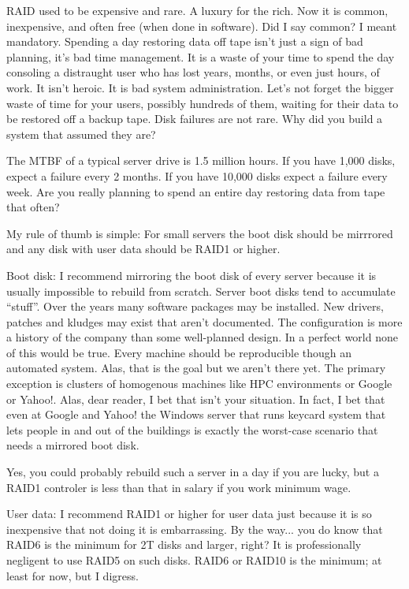 \documentclass{article}
\begin{document}
RAID used to be expensive and rare. A luxury for the rich. Now it is common, inexpensive, and often free (when done in software). Did I say common? I meant mandatory. Spending a day restoring data off tape isn't just a sign of bad planning, it's bad time management. It is a waste of your time to spend the day consoling a distraught user who has lost years, months, or even just hours, of work. It isn't heroic. It is bad system administration. Let's not forget the bigger waste of time for your users, possibly hundreds of them, waiting for their data to be restored off a backup tape. Disk failures are not rare. Why did you build a system that assumed they are?

The MTBF of a typical server drive is 1.5 million hours. If you have 1,000 disks, expect a failure every 2 months. If you have 10,000 disks expect a failure every week. Are you really planning to spend an entire day restoring data from tape that often?

My rule of thumb is simple: For small servers the boot disk should be mirrrored and any disk with user data should be RAID1 or higher.

Boot disk: I recommend mirroring the boot disk of every server because it is usually impossible to rebuild from scratch. Server boot disks tend to accumulate ``stuff''. Over the years many software packages may be installed. New drivers, patches and kludges may exist that aren't documented. The configuration is more a history of the company than some well-planned design. In a perfect world none of this would be true. Every machine should be reproducible though an automated system. Alas, that is the goal but we aren't there yet. The primary exception is clusters of homogenous machines like HPC environments or Google or Yahoo!. Alas, dear reader, I bet that isn't your situation. In fact, I bet that even at Google and Yahoo! the Windows server that runs keycard system that lets people in and out of the buildings is exactly the worst-case scenario that needs a mirrored boot disk.

Yes, you could probably rebuild such a server in a day if you are lucky, but a RAID1 controler is less than that in salary if you work minimum wage.

User data: I recommend RAID1 or higher for user data just because it is so inexpensive that not doing it is embarrassing. By the way... you do know that RAID6 is the minimum for 2T disks and larger, right? It is professionally negligent to use RAID5 on such disks. RAID6 or RAID10 is the minimum; at least for now, but I digress.
\end{document}
